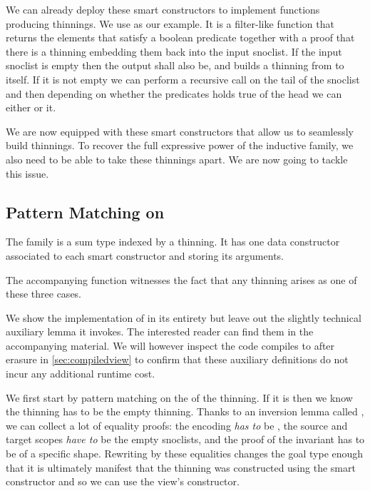 We can already deploy these smart constructors to implement functions producing
thinnings. We use  as our example. It is a filter-like
function that returns the elements that satisfy a boolean predicate together with
a proof that there is a thinning embedding them back into the input snoclist.
%
If the input snoclist is empty then the output shall also be, and
 builds a thinning from \IdrisData{[<]} to itself.
%
If it is not empty we can perform a recursive call on the tail of the snoclist
and then depending on whether the predicates holds true of the head we can either
 or  it.


We are now equipped with these smart constructors that allow us to seamlessly
build thinnings.
%
To recover the full expressive power of the inductive family, we also need to
be able to take these thinnings apart. We are now going to tackle this issue.

\subsection{Pattern Matching on }

The  family is a sum type indexed by a thinning. It has one
data constructor associated to each smart constructor and storing its arguments.


The accompanying  function witnesses the fact that any
thinning arises as one of these three cases.


We show the implementation of  in its entirety but leave
out the slightly technical auxiliary lemma it invokes.
%
The interested reader can find them in the accompanying material.
%
We will however inspect the code  compiles to after erasure
in \cref{sec:compiledview} to confirm that these auxiliary definitions do not
incur any additional runtime cost.

We first start by pattern matching on the  of the thinning.
If it is  then we know the thinning has to be the empty thinning.
%
Thanks to an inversion lemma called , we can collect a lot
of equality proofs: the encoding \emph{has to} be , the
source and target scopes \emph{have to} be the empty snoclists, and the
proof of the invariant has to be of a specific shape.
%
Rewriting by these equalities changes the goal type enough that it is ultimately
manifest that the thinning was constructed using the  smart
constructor and so we can use the view's  constructor.

